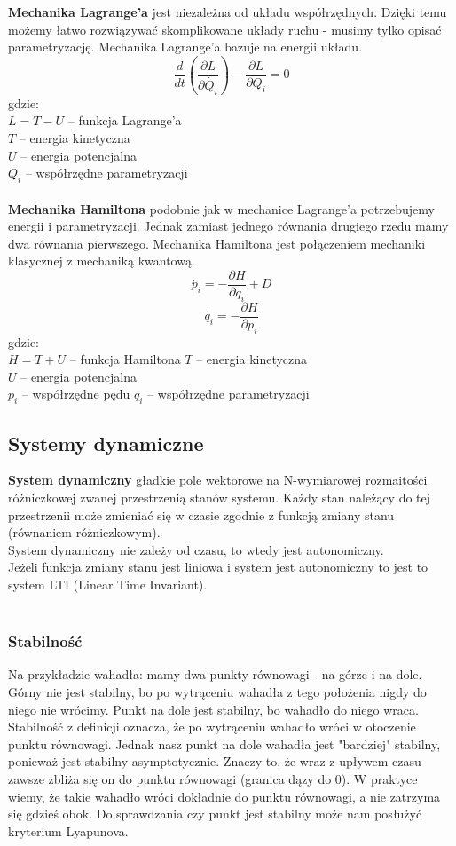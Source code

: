 \documentclass[12pt]{article}
\begin{document}
\textbf{Mechanika Lagrange'a} jest niezależna od układu współrzędnych. Dzięki temu możemy łatwo rozwiązywać skomplikowane układy ruchu - musimy tylko opisać parametryzację. Mechanika Lagrange'a bazuje na energii układu. 
$$ \dfrac{d}{dt} (\dfrac{\partial L}{\partial\dot{Q_{i}}}) - \dfrac{\partial L}{\partial Q_{i}} = 0$$
gdzie: \\
$L = T - U$ -- funkcja Lagrange'a\\
$T$ -- energia kinetyczna \\
$U$ -- energia potencjalna \\
$Q_{i}$ -- współrzędne parametryzacji\\
~\\
\textbf{Mechanika Hamiltona} podobnie jak w mechanice Lagrange'a potrzebujemy energii i parametryzacji. Jednak zamiast jednego równania drugiego rzedu mamy dwa równania pierwszego. Mechanika Hamiltona jest połączeniem mechaniki klasycznej z mechaniką kwantową.
$$ \dot{p_{i}} = - \dfrac{\partial H}{\partial q_{i}} + D $$
$$ \dot{q_{i}} = - \dfrac{\partial H}{\partial p_{i}} $$
gdzie: \\
$H = T + U $ -- funkcja Hamiltona
$T$ -- energia kinetyczna \\
$U$ -- energia potencjalna \\
$p_{i}$ -- współrzędne pędu
$q_{i}$ -- współrzędne parametryzacji

\subsection{Systemy dynamiczne}
\textbf{System dynamiczny} gładkie pole wektorowe na N-wymiarowej rozmaitości różniczkowej zwanej przestrzenią stanów systemu. Każdy stan należący do tej przestrzenii może zmieniać się w czasie zgodnie z funkcją zmiany stanu (równaniem różniczkowym). \\
System dynamiczny nie zależy od czasu, to wtedy jest autonomiczny. \\
Jeżeli funkcja zmiany stanu jest liniowa i system jest autonomiczny to jest to system LTI (Linear Time Invariant).\\
~\\
\subsubsection{Stabilność}
Na przykładzie wahadła: mamy dwa punkty równowagi - na górze i na dole. Górny nie jest stabilny, bo po wytrąceniu wahadła z tego położenia nigdy do niego nie wrócimy. Punkt na dole jest stabilny, bo wahadło do niego wraca. Stabilność z definicji oznacza, że po wytrąceniu wahadło wróci w otoczenie punktu równowagi. Jednak nasz punkt na dole wahadła jest "bardziej" stabilny, ponieważ jest stabilny asymptotycznie. Znaczy to, że wraz z upływem czasu zawsze zbliża się on do punktu równowagi (granica dązy do 0). W praktyce wiemy, że takie wahadło wróci dokładnie do punktu równowagi, a nie zatrzyma się gdzieś obok. Do sprawdzania czy punkt jest stabilny może nam posłużyć kryterium Lyapunova.\\
\end{document}

